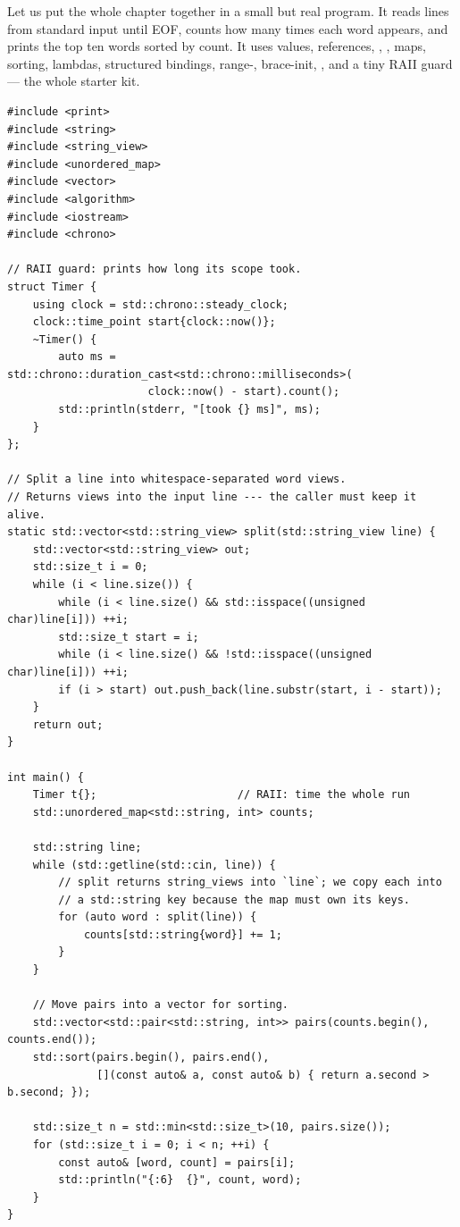 Let us put the whole chapter together in a small but real program.
It reads lines from standard input until EOF, counts how many times
each word appears, and prints the top ten words sorted by count.
It uses values, references, , ,
maps, sorting, lambdas, structured bindings, range-,
brace-init, , and a tiny RAII guard --- the whole
starter kit.

\begin{lstlisting}
#include <print>
#include <string>
#include <string_view>
#include <unordered_map>
#include <vector>
#include <algorithm>
#include <iostream>
#include <chrono>

// RAII guard: prints how long its scope took.
struct Timer {
    using clock = std::chrono::steady_clock;
    clock::time_point start{clock::now()};
    ~Timer() {
        auto ms = std::chrono::duration_cast<std::chrono::milliseconds>(
                      clock::now() - start).count();
        std::println(stderr, "[took {} ms]", ms);
    }
};

// Split a line into whitespace-separated word views.
// Returns views into the input line --- the caller must keep it alive.
static std::vector<std::string_view> split(std::string_view line) {
    std::vector<std::string_view> out;
    std::size_t i = 0;
    while (i < line.size()) {
        while (i < line.size() && std::isspace((unsigned char)line[i])) ++i;
        std::size_t start = i;
        while (i < line.size() && !std::isspace((unsigned char)line[i])) ++i;
        if (i > start) out.push_back(line.substr(start, i - start));
    }
    return out;
}

int main() {
    Timer t{};                      // RAII: time the whole run
    std::unordered_map<std::string, int> counts;

    std::string line;
    while (std::getline(std::cin, line)) {
        // split returns string_views into `line`; we copy each into
        // a std::string key because the map must own its keys.
        for (auto word : split(line)) {
            counts[std::string{word}] += 1;
        }
    }

    // Move pairs into a vector for sorting.
    std::vector<std::pair<std::string, int>> pairs(counts.begin(), counts.end());
    std::sort(pairs.begin(), pairs.end(),
              [](const auto& a, const auto& b) { return a.second > b.second; });

    std::size_t n = std::min<std::size_t>(10, pairs.size());
    for (std::size_t i = 0; i < n; ++i) {
        const auto& [word, count] = pairs[i];
        std::println("{:6}  {}", count, word);
    }
}
\end{lstlisting}

